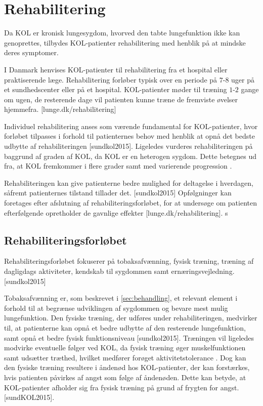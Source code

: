 \section{Rehabilitering}
Da KOL er kronisk lungesygdom, hvorved den tabte lungefunktion ikke kan genoprettes, tilbydes KOL-patienter rehabilitering med henblik på at mindske deres symptomer. 

I Danmark henvises KOL-patienter til rehabilitering fra et hospital eller praktiserende læge. Rehabilitering forløber typisk over en periode på $7$-$8$ uger på et sundhedscenter eller på et hospital. KOL-patienter møder til træning $1$-$2$ gange om ugen, de resterende dage vil patienten kunne træne de fremviste øvelser hjemmefra. \cite{McCarthy2015}[lunge.dk/rehabilitering] 

Individuel rehabilitering anses som værende fundamental for KOL-patienter, hvor forløbet tilpasses i forhold til patienternes behov med henblik at opnå det bedste udbytte af rehabiliteringen \cite{McCarthy2015,Habraken2011}[sundkol2015]. Ligeledes vurderes rehabiliteringen på baggrund af graden af KOL, da KOL er en heterogen sygdom. Dette betegnes ud fra, at KOL fremkommer i flere grader samt med varierende progression \cite{McCarthy2015}. 

Rehabiliteringen kan give patienterne bedre mulighed for deltagelse i hverdagen, såfremt patienternes tilstand tillader det. \cite{McCarthy2015,Habraken2011} [sundkol2015] Opfølgninger kan foretages efter afslutning af rehabiliteringsforløbet, for at undersøge om patienten efterfølgende opretholder de gavnlige effekter [lunge.dk/rehabilitering]. s


\subsection{Rehabiliteringsforløbet}
Rehabiliteringsforløbet fokuserer på tobaksafvænning, fysisk træning, træning af dagligdags aktiviteter, kendskab til sygdommen samt ernæringsvejledning. \cite{McCarthy2015,Habraken2011} [sundkol2015] 

Tobaksafvænning er, som beskrevet i \autoref{sec:behandling}, et relevant element i forhold til at begrænse udviklingen af sygdommen og bevare mest mulig lungefunktion. Den fysiske træning, der udføres under rehabiliteringen, medvirker til, at patienterne kan opnå et bedre udbytte af den resterende lungefunktion, samt opnå et bedre fysisk funktionsniveau [sundkol2015]. 
Træningen vil ligeledes modvirke eventuelle følger ved KOL, da fysisk træning øger muskelfunktionen samt udsætter træthed, hvilket medfører forøget aktivitetstolerance \cite{McCarthy2015}. Dog kan den fysiske træning resultere i åndenød hos KOL-patienter, der kan forstærkes, hvis patienten påvirkes af angst som følge af åndenøden. Dette kan betyde, at KOL-patienter afholder sig fra fysisk træning på grund af frygten for angst. \cite{McCarthy2015} [sundKOL2015]. 

